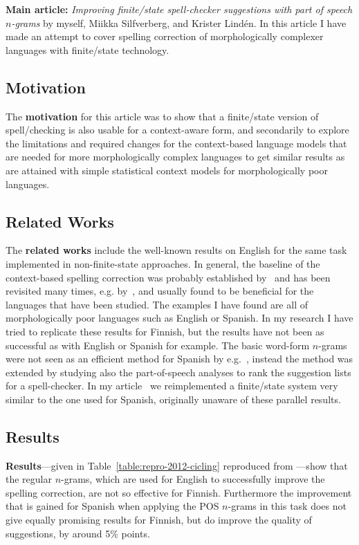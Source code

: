 \documentclass[officiallayout,final]{unihelcompling}
\begin{document}
\textbf{Main article:} \emph{Improving finite\-/state spell-checker suggestions
with part of speech \(n\)-grams} by myself, Miikka Silfverberg, and Krister
Lindén. In this article I have made an attempt to cover spelling correction
of morphologically complexer languages with finite\-/state technology.

\subsection{Motivation}

The \textbf{motivation} for this article was to show that a finite\-/state
version of spell\-/checking is also usable for a context-aware form, and
secondarily to explore the limitations and required changes for the
context-based language models that are needed for more morphologically complex
languages to get similar results as are attained with simple statistical
context models for morphologically poor languages.

\subsection{Related Works}

The \textbf{related works} include the well-known results on English for the
same task implemented in non-finite-state approaches.  In general, the baseline of the
context-based spelling correction was probably established
by~\citet{mays1991context} and has been revisited many times, e.g.
by~\citet{wilcox-ohearn2008realword}, and usually found to be beneficial for
the languages that have been studied. The examples I have found are all of
morphologically poor languages such as English or Spanish. In my research I
have tried to replicate these results for Finnish, but the results have not
been as successful as with English or Spanish for example.  The basic word-form
\(n\)-grams were not seen as an efficient method for Spanish by
e.g.~\citet{otero2007contextual}, instead the method was extended by studying
also the part-of-speech analyses to rank the suggestion lists for a
spell-checker. In my article~ we reimplemented
a finite\-/state system very similar to the one used for Spanish, originally
unaware of these parallel results.

\subsection{Results}

\textbf{Results}---given in Table~\ref{table:repro-2012-cicling} reproduced
from ---show that the regular \(n\)-grams, which
are used for English to successfully improve the spelling correction, are not
so effective for Finnish.  Furthermore the improvement that is gained for
Spanish when applying the POS \(n\)-grams in this task does not give equally
promising results for Finnish, but do improve the quality of suggestions, by
around 5\% points.
\end{document}
